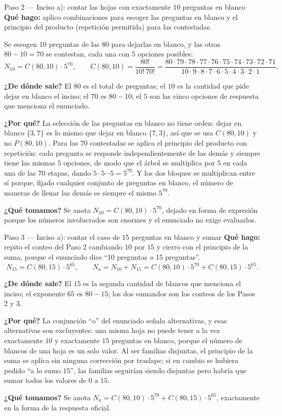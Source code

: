 \documentclass[11pt]{article}
\begin{document}
\begin{paso}{Paso 2 --- Inciso a): contar las hojas con exactamente 10 preguntas en blanco}
\textbf{Qué hago:} aplico combinaciones para escoger las preguntas en blanco y el principio del producto (repetición permitida) para las contestadas.

Se escogen $10$ preguntas de las $80$ para dejarlas en blanco, y las otras $80-10=70$ se contestan, cada una con $5$ opciones posibles:
\[
  N_{10}=C(80,10)\cdot 5^{70},\qquad
  C(80,10)=\frac{80!}{10!\,70!}=\frac{80\cdot 79\cdot 78\cdot 77\cdot 76\cdot 75\cdot 74\cdot 73\cdot 72\cdot 71}{10\cdot 9\cdot 8\cdot 7\cdot 6\cdot 5\cdot 4\cdot 3\cdot 2\cdot 1}.
\]

\textbf{¿De dónde sale?} El $80$ es el total de preguntas; el $10$ es la cantidad que pide dejar en blanco el inciso; el $70$ es $80-10$; el $5$ son las cinco opciones de respuesta que menciona el enunciado.

\textbf{¿Por qué?} La selección de las preguntas en blanco no tiene orden: dejar en blanco $\{3,7\}$ es lo mismo que dejar en blanco $\{7,3\}$, así que se usa $C(80,10)$ y no $P(80,10)$. Para las $70$ contestadas se aplica el principio del producto con repetición: cada pregunta se responde independientemente de las demás y siempre tiene las mismas $5$ opciones, de modo que el árbol se multiplica por $5$ en cada una de las $70$ etapas, dando $5\cdot 5\cdots 5=5^{70}$. Y los dos bloques se multiplican entre sí porque, fijado cualquier conjunto de preguntas en blanco, el número de maneras de llenar las demás es siempre el mismo $5^{70}$.

\textbf{¿Qué tomamos?} Se anota $N_{10}=C(80,10)\cdot 5^{70}$, dejado en forma de expresión porque los números involucrados son enormes y el enunciado no exige evaluarlos.
\end{paso}

\begin{paso}{Paso 3 --- Inciso a): contar el caso de 15 preguntas en blanco y sumar}
\textbf{Qué hago:} repito el conteo del Paso 2 cambiando $10$ por $15$ y cierro con el principio de la suma, porque el enunciado dice ``10 preguntas \emph{o} 15 preguntas''.
\[
  N_{15}=C(80,15)\cdot 5^{65},\qquad
  N_a=N_{10}+N_{15}=C(80,10)\cdot 5^{70}+C(80,15)\cdot 5^{65} .
\]

\textbf{¿De dónde sale?} El $15$ es la segunda cantidad de blancos que menciona el inciso; el exponente $65$ es $80-15$; los dos sumandos son los conteos de los Pasos 2 y 3.

\textbf{¿Por qué?} La conjunción ``o'' del enunciado señala alternativas, y esas alternativas son excluyentes: una misma hoja no puede tener a la vez exactamente $10$ y exactamente $15$ preguntas en blanco, porque el número de blancos de una hoja es un solo valor. Al ser familias disjuntas, el principio de la suma se aplica sin ninguna corrección por traslape; si en cambio se hubiera pedido ``a lo sumo $15$'', las familias seguirían siendo disjuntas pero habría que sumar todos los valores de $0$ a $15$.

\textbf{¿Qué tomamos?} Se anota $N_a=C(80,10)\cdot 5^{70}+C(80,15)\cdot 5^{65}$, exactamente en la forma de la respuesta oficial.
\end{paso}
\end{document}
